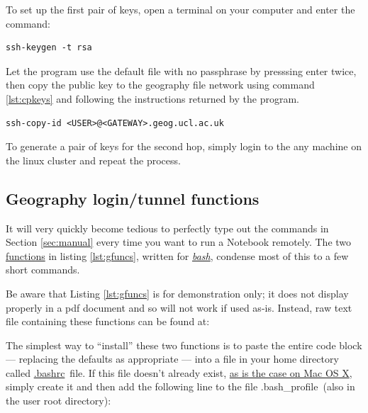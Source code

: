 \documentclass[a4paper]{article}
\begin{document}
To set up the first pair of keys, open a terminal on your computer and enter the command:
\begin{lstlisting}[caption={Generate SSH keys}, label={lst:genkeys}]
ssh-keygen -t rsa
\end{lstlisting}
Let the program use the default file with no passphrase by presssing enter twice, then copy the public key to the geography file network using command \ref{lst:cpkeys} and following the instructions returned by the program.

\begin{lstlisting}[caption={Copy public key to geography file system}, label={lst:cpkeys}]
ssh-copy-id <USER>@<GATEWAY>.geog.ucl.ac.uk
\end{lstlisting}

To generate a pair of keys for the second hop, simply login to the any machine on the linux cluster and repeat the process.

\subsection{Geography login/tunnel functions}
\label{sec:gfuncs}

It will very quickly become tedious to perfectly type out the commands in Section \ref{sec:manual} every time you want to run a Notebook remotely.
The two \href{https://www.shellscript.sh/functions.html}{functions} in listing \ref{lst:gfuncs}, written for \href{http://cs.lmu.edu/~ray/notes/bash/}{\emph{bash}}, condense most of this to a few short commands.



Be aware that Listing \ref{lst:gfuncs} is for demonstration only; it does not display properly in a pdf document and so will not work if used as-is.
Instead, raw text file containing these functions can be found at:


The simplest way to ``install'' these two functions is to paste the entire code block --- replacing the defaults as appropriate --- into a file in your home directory called \href{http://superuser.com/questions/49289/what-is-the-bashrc-file}{.bashrc}~file.
If this file doesn't already exist, \href{http://apple.stackexchange.com/a/119714}{as is the case on Mac OS X}, simply create it and then add the following line to the file .bash\_profile~(also in the user root directory):
\end{document}
